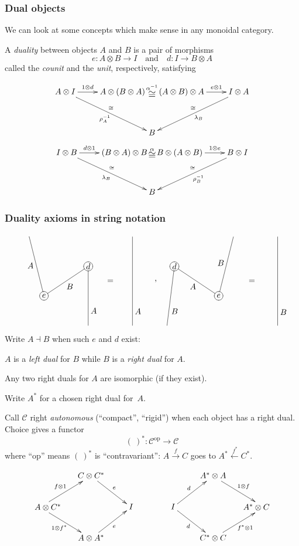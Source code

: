 \documentclass{beamer}
\newcommand{\lra}{\longrightarrow}
\def\CC{{\mathscr C}}
\begin{document}
\begin{frame}
\frametitle{Dual objects}
We can look at some concepts which make sense in any monoidal category.

A \emph{duality} between objects $A$ and $B$ is a pair of morphisms
\[
e : A \otimes B \lra I  \quad \mbox{and} \quad d : I \lra B \otimes A
\]
called the \textit{counit} and the \textit{unit}, respectively, satisfying

\[
 \xymatrix @R+3mm {
 A \otimes I \ar[r]^-{1\otimes d} \ar[rd]_{\rho_A^{-1}}^\cong 
 & A \otimes (B\otimes A) {\alpha^{-1} \atop {\mbox{\large $\cong$}}}  (A\otimes B)\otimes A \ar[r]^-{e\otimes 1}
 & I \otimes A \ar[ld]^{\lambda_B}_\cong \\
 & B }
\]
\[
 \xymatrix@R+3mm {
 I \otimes B \ar[r]^-{d\otimes 1} \ar[rd]_{\lambda_B}^\cong 
 & (B\otimes A) \otimes B {\alpha \atop {\mbox{\large $\cong$}}}  B\otimes (A\otimes B)\ar[r]^-{1\otimes e}
 & B \otimes I \ar[ld]^{\rho_B^{-1}}_\cong \\
 & B }
\]
\end{frame}
\begin{frame}
\frametitle{Duality axioms in string notation}
\[ 
\xygraph{!{0;(2.6,0):(0,.5)::} {\xybox{\xygraph{{e} *\xycircle{-}="e" [r(1.5)u] {d} *\xycircle{-}="a" "e"(-[u(2)l(.5)]^-*{A},-"a"_-*{B}-[d(2)]^(.75)*{A} [r(1.5)] -[u(3)]_(.16)*{A}) "a" [r(.75)d(.5)] {=}}}}  
 [r(1.0)] *\txt{,} [r(0.8)]
{\xybox{\xygraph{{d} *\xycircle{-}="a" [r(1.5)d] {e} *\xycircle{-}="e" "a"(-[d(2)l(.25)]^(.75)*{B},-"e"_-*{A}-[u(2)r(.5)]^-*{B} [r(1.5)] -[d(3)]^(.85)*{B}) "e" [r(1.125)u(.5)] {=}}}}} 
\]
Write $A \dashv B$  when such $e$ and $d$ exist: 

$A$ is a \emph{left dual} for $B$ while $B$ is a \emph{right dual} for $A$. 

\bigskip
Any two right duals for $A$ are isomorphic (if they exist). 

\bigskip
Write $A^\ast$ for a chosen right dual for~$A$. 
\end{frame}
\begin{frame}
Call $\CC$ right \emph{autonomous} (``compact'', ``rigid'') when each object has a right dual. 
Choice gives a functor
\[
( \ )^\ast : \CC^{\mathrm{op}}   \lra \CC
\]
where ``$\mathrm{op}$'' means $( \ )^\ast$ is ``contravariant'': 
$A \stackrel{f}{\lra} C$ goes to  $A^\ast \stackrel{\ f^\ast}{\longleftarrow} C^\ast $.

\[
\xymatrix{  & C\otimes C^\ast \ar[rd]^{e} \\
*+!L(.5){A \otimes C^\ast}\ar[ru]^{f\otimes 1} \ar[rd]_{1\otimes f^\ast} & & I \\
 & A\otimes A^\ast   \ar[ru]_{e} }  
\qquad\qquad
\xymatrix{  & A^\ast \otimes A \ar[rd]^-{1\otimes f} \\
I \ar[ru]^-{d} \ar[rd]_-{d} & & *+!R(.5){A^\ast \otimes C} \\
 & C^\ast \otimes C   \ar[ru]_-{f^\ast \otimes 1} }
 \]
\end{frame}
\end{document}

